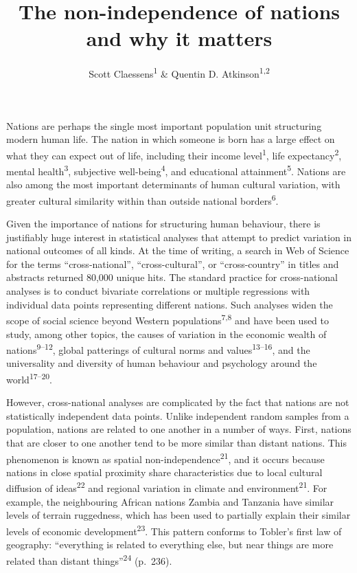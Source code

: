 \documentclass[english,man,floatsintext]{apa6}
\title{The non-independence of nations and why it matters}
\author{Scott Claessens\textsuperscript{1} \& Quentin D. Atkinson\textsuperscript{1,2}}
\date{}
\affiliation{\vspace{0.5cm}\textsuperscript{1} School of Psychology, University of Auckland, Auckland, New Zealand\\\textsuperscript{2} Max Planck Institute for Evolutionary Anthropology, Leipzig, Germany}
\begin{document}
\maketitle

Nations are perhaps the single most important population unit structuring modern human life. The nation in which someone is born has a large effect on what they can expect out of life, including their income level\textsuperscript{1}, life expectancy\textsuperscript{2}, mental health\textsuperscript{3}, subjective well-being\textsuperscript{4}, and educational attainment\textsuperscript{5}. Nations are also among the most important determinants of human cultural variation, with greater cultural similarity within than outside national borders\textsuperscript{6}.

Given the importance of nations for structuring human behaviour, there is justifiably huge interest in statistical analyses that attempt to predict variation in national outcomes of all kinds. At the time of writing, a search in Web of Science for the terms \enquote{cross-national}, \enquote{cross-cultural}, or \enquote{cross-country} in titles and abstracts returned 80,000 unique hits. The standard practice for cross-national analyses is to conduct bivariate correlations or multiple regressions with individual data points representing different nations. Such analyses widen the scope of social science beyond Western populations\textsuperscript{7,8} and have been used to study, among other topics, the causes of variation in the economic wealth of nations\textsuperscript{9--12}, global patterings of cultural norms and values\textsuperscript{13--16}, and the universality and diversity of human behaviour and psychology around the world\textsuperscript{17--20}.

However, cross-national analyses are complicated by the fact that nations are not statistically independent data points. Unlike independent random samples from a population, nations are related to one another in a number of ways. First, nations that are closer to one another tend to be more similar than distant nations. This phenomenon is known as spatial non-independence\textsuperscript{21}, and it occurs because nations in close spatial proximity share characteristics due to local cultural diffusion of ideas\textsuperscript{22} and regional variation in climate and environment\textsuperscript{21}. For example, the neighbouring African nations Zambia and Tanzania have similar levels of terrain ruggedness, which has been used to partially explain their similar levels of economic development\textsuperscript{23}. This pattern conforms to Tobler's first law of geography: \enquote{everything is related to everything else, but near things are more related than distant things}\textsuperscript{24} (p.~236).
\end{document}
